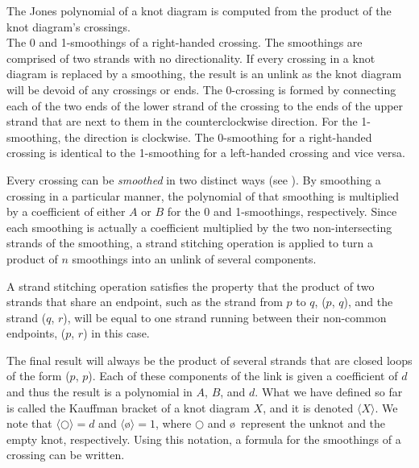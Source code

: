 \begin{paper}
The Jones polynomial of a knot diagram is computed from the product of the knot
diagram's crossings.\\

{The 0 and 1-smoothings of a right-handed crossing.
The smoothings are comprised of two strands with no directionality.
If every crossing in a knot diagram is replaced by a smoothing, the result is an
unlink as the knot diagram will be devoid of any crossings or ends.
The 0-crossing is formed by connecting each of the two ends of the lower strand
of the crossing to the ends of the upper strand that are next to them in the
counterclockwise direction.
For the 1-smoothing, the direction is clockwise.
The 0-smoothing for a right-handed crossing is identical to the 1-smoothing for
a left-handed crossing and vice versa.}

Every crossing can be \textit{smoothed} in two distinct ways (see
\figSmoothings).
By smoothing a crossing in a particular manner, the polynomial of that smoothing
is multiplied by a coefficient of either $A$ or $B$ for the 0 and 1-smoothings,
respectively.
Since each smoothing is actually a coefficient multiplied by the two
non-intersecting strands of the smoothing, a strand stitching operation is
applied to turn a product of $n$ smoothings into an unlink of several
components.

A strand stitching operation satisfies the property that the product of two
strands that share an endpoint, such as the strand from $p$ to $q$, ($p$, $q$),
and the strand ($q$, $r$), will be equal to one strand running between their
non-common endpoints, ($p$, $r$) in this case.

The final result will always be the product of several strands that are closed
loops of the form ($p$, $p$).
Each of these components of the link is given a coefficient of $d$ and thus the
result is a polynomial in $A$, $B$, and $d$.
What we have defined so far is called the Kauffman bracket of a knot diagram
$X$, and it is denoted $\langle X\rangle$.
We note that $\langle\bigcirc\rangle=d$ and $\langle$\o$\rangle=1$, where
$\bigcirc$ and \o~represent the unknot and the empty knot, respectively.
Using this notation, a formula for the smoothings of a crossing can be written.


\end{paper}
